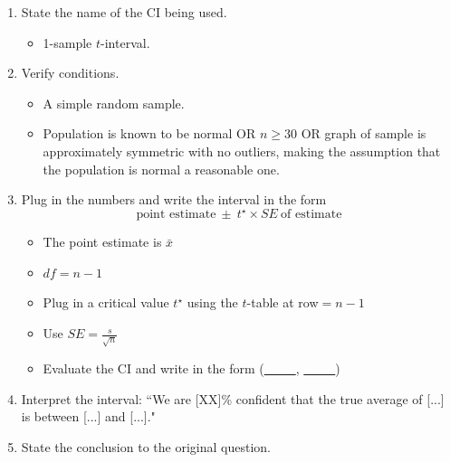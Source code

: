 \begin{termBox}{\vspace{-1mm}
\begin{enumerate}
\setlength{\itemsep}{0mm}
\item State the name of the CI being used.\vspace{-1.5mm}
\begin{itemize}
\setlength{\itemsep}{0mm}
\item 1-sample $t$-interval.
\end{itemize}
\item Verify conditions.\vspace{-1.5mm}
\begin{itemize}
\setlength{\itemsep}{0mm}
\item A simple random sample.
\item Population is known to be normal OR $n\ge 30$ OR graph of sample is approximately symmetric with no outliers, making the assumption that the population is normal a reasonable one.
\end{itemize}
\item Plug in the numbers and write the interval in the form
$$\text{point estimate}\ \pm\ t^{\star} \times SE\ \text{of estimate}$$
\begin{itemize}
\setlength{\itemsep}{0mm}
\item The point estimate is $\bar{x}$
\item $df = n-1$
\item Plug in a critical value $t^{\star}$ using the $t$-table at row$=n-1$
\item Use $SE = \frac{s}{\sqrt{n}}$
\item Evaluate the CI and write in the form (\underline{\ \ \ \ \ }, \underline{\ \ \ \ \ })
\end{itemize}
\item Interpret the interval:  ``We are [XX]\% confident that the true average of [...] is between [...] and [...]."
\item State the conclusion to the original question.
\end{enumerate}}
\end{termBox}

